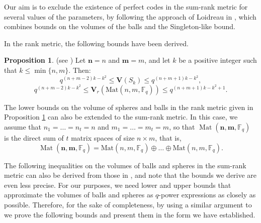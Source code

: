 \documentclass[11pt]{amsart}
\DeclareMathOperator{\Mat}{Mat}
\theoremstyle{definition}
\newtheorem{proposition}[theorem]{Proposition}
\newcommand{\F}{{\mathbb F}}
\newcommand{\bfn}{\mathbf {n}}
\newcommand{\bfm}{\mathbf {m}}
\newcommand{\fq}{{\mathbb F}_{q}}
\newcommand{\spacmn}{\Mat(\bfn,\bfm,\F_q)}
\begin{document}
Our aim is to exclude the existence of perfect codes in the sum-rank metric for several values of the parameters, by following the approach of Loidreau in \cite{loidreau2006properties}, which combines bounds on the volumes of the balls and the Singleton-like bound.

In the rank metric, the following bounds have been derived.

\begin{proposition} \label{d1}(see \cite[Proposition 1]{loidreau2006properties})
Let $\mathbf{n}=n$ and $\mathbf{m}=m$, and let $ k $ be a positive integer such that $ k \leq \min\{n, m\} $. Then:
\[
q^{(n + m - 2)k - k^2} \leq \mathbf{V}(S_k) \leq q^{(n + m + 1)k - k^2},
\]
\[
q^{(n + m - 2)k - k^2} \leq \mathbf{V}_r(\mathrm{Mat}(n,m,\fq)) \leq q^{(n + m + 1)k - k^2 + 1}.
\]
\end{proposition}

The lower bounds on the volume of spheres and balls in the rank metric given in Proposition \ref{d1} can also be extended to the sum-rank metric. In this case, we assume that $ n_1 = \ldots = n_t = n $ and $ m_1 = \ldots = m_t = m $, so that $ \spacmn $ is the direct sum of $ t $ matrix spaces of size $ n \times m $, that is,
\[
\spacmn = \mathrm{Mat}(n,m,\fq) \oplus \ldots \oplus \mathrm{Mat}(n,m,\fq).
\]

The following inequalities on the volumes of balls and spheres in the sum-rank metric can also be derived from those in \cite{sauerbier2025bounds,puchinger2022generic,ott2021bounds}, and note that the bounds we derive are even less precise. For our purposes, we need lower and upper bounds that approximate the volumes of balls and spheres as $q$-power expressions as closely as possible. Therefore, for the sake of completeness, by using a similar argument to \cite{ott2021bounds} we prove the following bounds and present them in the form we have established.
\end{document}

